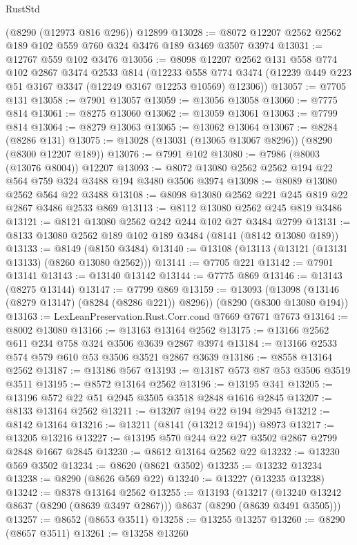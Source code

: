 \begin{lexlean}{RustStd}
\begin{coremodule}
    (@8290 (@12973 @816 @296))
    @12899
@13028 := @8072 @12207 @2562 @2562 @189 @102 @559 @760 @324 @3476 @189 @3469 @3507 @3974
@13031 := @12767 @559 @102 @3476
@13056 := @8098
    @12207
    @2562
    @131
    @558
    @774
    @102
    @2867
    @3474
    @2533
    @814
    (@12233 @558 @774 @3474 (@12239 @449 @223 @51 @3167 @3347 (@12249 @3167 @12253 @10569) @12306))
@13057 := @7705 @131
@13058 := @7901 @13057
@13059 := @13056 @13058
@13060 := @7775 @814
@13061 := @8275 @13060
@13062 := @13059 @13061
@13063 := @7799 @814
@13064 := @8279 @13063
@13065 := @13062 @13064
@13067 := @8284 (@8286 @131)
@13075 := @13028 (@13031 (@13065 @13067 @8296)) (@8290 (@8300 @12207 @189))
@13076 := @7991 @102
@13080 := @7986 (@8003 (@13076 @8004)) @12207
@13093 := @8072 @13080 @2562 @2562 @194 @22 @564 @759 @324 @3488 @194 @3480 @3506 @3974
@13098 := @8089 @13080 @2562 @564 @22 @3488
@13108 := @8098 @13080 @2562 @221 @245 @819 @22 @2867 @3486 @2533 @869
@13113 := @8112 @13080 @2562 @245 @819 @3486
@13121 := @8121 @13080 @2562 @242 @244 @102 @27 @3484 @2799
@13131 := @8133 @13080 @2562 @189 @102 @189 @3484 (@8141 (@8142 @13080 @189))
@13133 := @8149 (@8150 @3484)
@13140 := @13108 (@13113 (@13121 (@13131 @13133) (@8260 @13080 @2562)))
@13141 := @7705 @221
@13142 := @7901 @13141
@13143 := @13140 @13142
@13144 := @7775 @869
@13146 := @13143 (@8275 @13144)
@13147 := @7799 @869
@13159 := @13093
    (@13098 (@13146 (@8279 @13147) (@8284 (@8286 @221)) @8296))
    (@8290 (@8300 @13080 @194))
@13163 := LexLeanPreservation.Rust.Corr.cond @7669 @7671 @7673
@13164 := @8002 @13080
@13166 := @13163 @13164 @2562
@13175 := @13166 @2562 @611 @234 @758 @324 @3506 @3639 @2867 @3974
@13184 := @13166 @2533 @574 @579 @610 @53 @3506 @3521 @2867 @3639
@13186 := @8558 @13164 @2562
@13187 := @13186 @567
@13193 := @13187 @573 @87 @53 @3506 @3519 @3511
@13195 := @8572 @13164 @2562
@13196 := @13195 @341
@13205 := @13196 @572 @22 @51 @2945 @3505 @3518 @2848 @1616 @2845
@13207 := @8133 @13164 @2562
@13211 := @13207 @194 @22 @194 @2945
@13212 := @8142 @13164
@13216 := @13211 (@8141 (@13212 @194)) @8973
@13217 := @13205 @13216
@13227 := @13195 @570 @244 @22 @27 @3502 @2867 @2799 @2848 @1667 @2845
@13230 := @8612 @13164 @2562 @22
@13232 := @13230 @569 @3502
@13234 := @8620 (@8621 @3502)
@13235 := @13232 @13234
@13238 := @8290 (@8626 @569 @22)
@13240 := @13227 (@13235 @13238)
@13242 := @8378 @13164 @2562
@13255 := @13193
    (@13217 (@13240 @13242 @8637 (@8290 (@8639 @3497 @2867))) @8637 (@8290 (@8639 @3491 @3505)))
@13257 := @8652 (@8653 @3511)
@13258 := @13255 @13257
@13260 := @8290 (@8657 @3511)
@13261 := @13258 @13260

\end{coremodule}
\end{lexlean}
